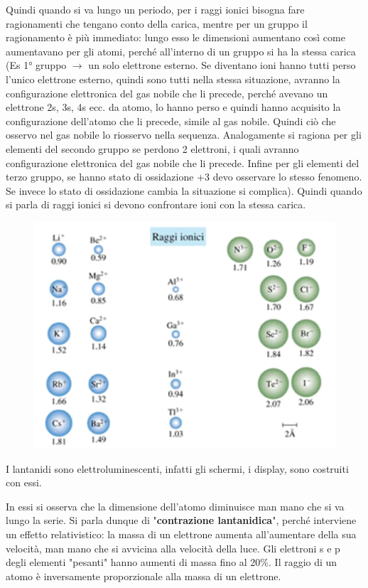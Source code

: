 Quindi quando si va lungo un periodo, per i raggi ionici bisogna fare ragionamenti che tengano conto della carica, mentre per un gruppo il ragionamento è più immediato: lungo esso le dimensioni aumentano così come aumentavano per gli atomi, perché all'interno di un gruppo si ha la stessa carica (Es 1° gruppo $\rightarrow$ un solo elettrone esterno. Se diventano ioni hanno tutti perso l'unico elettrone esterno, quindi sono tutti nella stessa situazione, avranno la configurazione elettronica del gas nobile che li precede, perché avevano un elettrone 2s, 3s, 4s ecc. da atomo, lo hanno perso e quindi hanno acquisito la configurazione dell'atomo che li precede, simile al gas nobile. Quindi ciò che osservo nel gas nobile lo riosservo nella sequenza. Analogamente si ragiona per gli elementi del secondo gruppo se perdono 2 elettroni, i quali avranno configurazione elettronica del gas nobile che li precede. Infine per gli elementi del terzo gruppo, se hanno stato di ossidazione +3 devo osservare lo stesso fenomeno. Se invece lo stato di ossidazione cambia la situazione si complica). Quindi quando si parla di raggi ionici si devono confrontare ioni con la stessa carica.

\begin{figure}[htp]
    \centering
    \includegraphics[width=12cm]{immagini/raggi-ionici.png}
\end{figure}

I lantanidi sono elettroluminescenti, infatti gli schermi, i display, sono costruiti con essi.

In essi si osserva che la dimensione dell'atomo diminuisce man mano che si va lungo la serie. Si parla dunque di "\textbf{contrazione lantanidica}", perché interviene un effetto relativistico: la massa di un elettrone aumenta all'aumentare della sua velocità, man mano che si avvicina alla velocità della luce. Gli elettroni s e p degli elementi "pesanti" hanno aumenti di massa fino al 20\%. Il raggio di un atomo è inversamente proporzionale alla massa di un elettrone.
